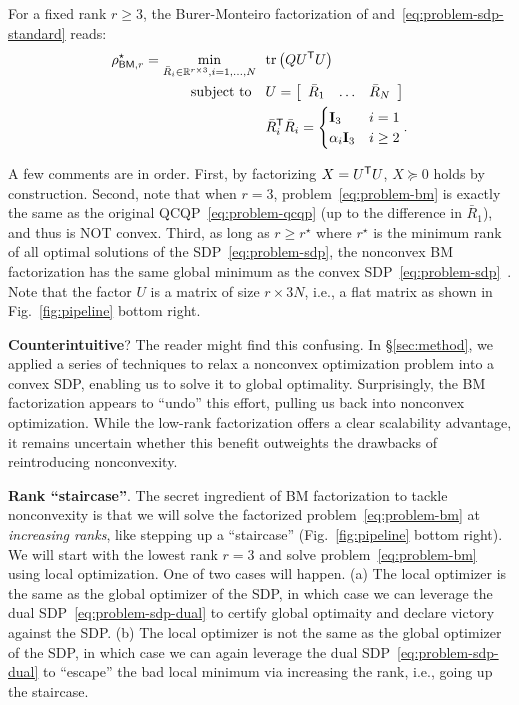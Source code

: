 \begin{proposition}[BM Factorization]\label{prop:BM}
    For a fixed rank $r \geq 3$, the Burer-Monteiro factorization of  and~\eqref{eq:problem-sdp-standard} reads:
    \begin{subequations}\label{eq:problem-bm}
        \begin{align} 
            \rho^\star_{\xmbm,r} = \min_{ \bar{R}_i \in \Real{r \times 3},i=1,\dots,N } & \ \ \trace{ Q U\tran U } \\
            \subject & \ \ U = \bmat{ccc}\bar{R}_1& \dots &\bar{R}_N \emat  \\
            & \ \ \bar{R}_i \tran \bar{R}_i = \begin{cases}
                \eye_3 & i=1 \\
                \alpha_i\eye_3 & i\geq 2
            \end{cases}.
            \end{align}
    \end{subequations}
\end{proposition}

A few comments are in order. First, by factorizing $X = U^{\mathsf{T}} U$, $X \succeq 0$ holds by construction. Second, note that when $r = 3$, problem~\eqref{eq:problem-bm} is exactly the same as the original QCQP~\eqref{eq:problem-qcqp} (up to the difference in $\bar{R}_1$), and thus is NOT convex. Third, as long as $r \geq r^\star$ where $r^\star$ is the minimum rank of all optimal solutions of the SDP~\eqref{eq:problem-sdp}, the nonconvex BM factorization has the same global minimum as the convex SDP~\eqref{eq:problem-sdp}~\cite{yang24book-sdp,burer2003nonlinear}. Note that the factor $U$ is a matrix of size $r \times 3N$, i.e., a flat matrix as shown in Fig.~\ref{fig:pipeline} bottom right.

\textbf{Counterintuitive}? The reader might find this confusing. In \S\ref{sec:method}, we applied a series of techniques to relax a nonconvex optimization problem into a convex SDP, enabling us to solve it to global optimality. Surprisingly, the BM factorization appears to ``undo'' this effort, pulling us back into nonconvex optimization. While the low-rank factorization offers a clear scalability advantage, it remains uncertain whether this benefit outweights the drawbacks of reintroducing nonconvexity.

\textbf{Rank ``staircase''}. The secret ingredient of BM factorization to tackle nonconvexity is that we will solve the factorized problem~\eqref{eq:problem-bm} at \emph{increasing ranks}, like stepping up a ``staircase'' (\cf Fig.~\ref{fig:pipeline} bottom right). We will start with the lowest rank $r=3$ and solve problem~\eqref{eq:problem-bm} using local optimization. One of two cases will happen. (a) The local optimizer is the same as the global optimizer of the SDP, in which case we can leverage the dual SDP~\eqref{eq:problem-sdp-dual} to certify global optimaity and declare victory against the SDP. (b) The local optimizer is not the same as the global optimizer of the SDP, in which case we can again leverage the dual SDP~\eqref{eq:problem-sdp-dual} to ``escape'' the bad local minimum via increasing the rank, i.e., going up the staircase. 

